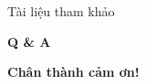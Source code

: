 \documentclass[10pt]{beamer}
\newcommand{\themename}{\textbf{\textsc{metropolis}}\xspace}
\begin{document}






\begin{frame}[fragile]{Tài liệu tham khảo}
  
  
\end{frame}

\begin{frame}[fragile]
  \begin{center}
    \LARGE \textbf{Q \& A}
  \end{center}
\end{frame}

\begin{frame}[fragile]
  \begin{center}
    \LARGE \textbf{Chân thành cảm ơn!}
  \end{center}
\end{frame}
\end{document}
